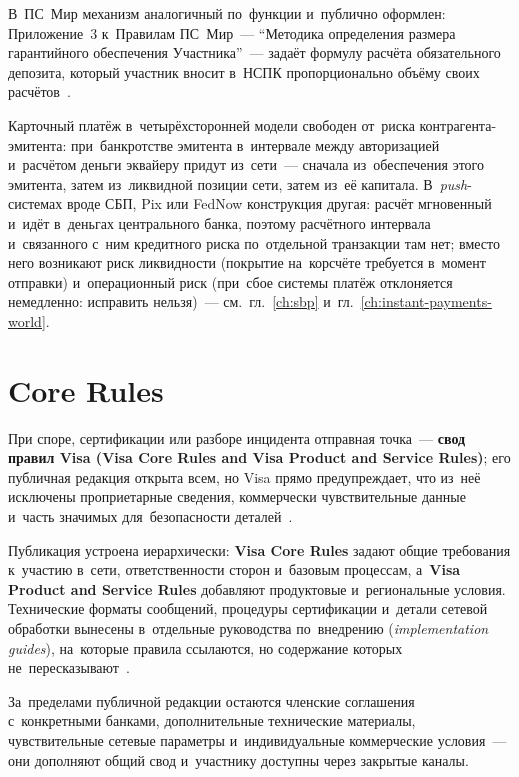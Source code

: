 В~ПС~Мир механизм аналогичный по~функции и~публично оформлен:
Приложение~3 к~Правилам ПС~Мир~--- \enquote{Методика определения
размера гарантийного обеспечения Участника}~--- задаёт формулу расчёта
обязательного депозита, который участник вносит в~НСПК пропорционально объёму
своих расчётов~\cite{nspk-mir-guarantee-fee-method}.

Карточный платёж в~четырёхсторонней модели свободен от~риска
контрагента-эмитента: при~банкротстве эмитента в~интервале между авторизацией
и~расчётом деньги эквайеру придут из~сети~--- сначала из~обеспечения этого
эмитента, затем из~ликвидной позиции сети, затем из~её капитала.
В~\textit{push}-системах вроде СБП, Pix или FedNow конструкция другая: расчёт
мгновенный и~идёт в~деньгах центрального банка, поэтому расчётного интервала
и~связанного с~ним кредитного риска по~отдельной транзакции там нет; вместо
него возникают риск ликвидности (покрытие на~корсчёте требуется в~момент
отправки) и~операционный риск (при~сбое системы платёж отклоняется немедленно:
исправить нельзя)~--- см.~гл.~\ref{ch:sbp}
и~гл.~\ref{ch:instant-payments-world}.

\section{Core Rules}\label{sec:visa-core-rules}

При споре, сертификации или разборе инцидента отправная точка~--- \textbf{свод
правил Visa (Visa Core Rules and Visa Product and Service Rules)}; его
публичная редакция открыта всем, но Visa прямо предупреждает,
что из~неё исключены проприетарные сведения, коммерчески чувствительные данные
и~часть значимых для~безопасности деталей~\cite{visa-core-rules}.

Публикация устроена иерархически: \textbf{Visa Core Rules} задают общие
требования к~участию в~сети, ответственности сторон и~базовым процессам,
а~\textbf{Visa Product and Service Rules} добавляют продуктовые и~региональные
условия. Технические форматы сообщений, процедуры сертификации и~детали
сетевой обработки вынесены в~отдельные руководства по~внедрению (\textit{implementation
guides}), на~которые правила ссылаются, но содержание которых
не~пересказывают~\cite{visa-core-rules}.

За~пределами публичной редакции остаются членские соглашения с~конкретными
банками, дополнительные технические материалы, чувствительные сетевые параметры
и~индивидуальные коммерческие условия~--- они дополняют общий свод и~участнику
доступны через закрытые каналы.

